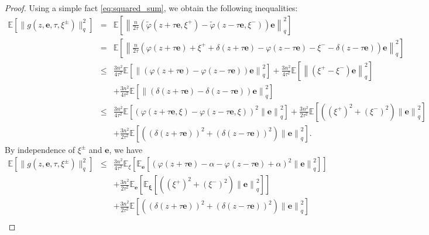 \documentclass[runningheads]{llncs}
\begin{document}
\begin{proof} Using a simple fact \eqref{eq:squared_sum}, we obtain the following inequalities:
    \begin{eqnarray*}
  \mathbb{E}\left[ \|g(z, \mathbf{e}, \tau,  \xi^{\pm})\|^2_q\right]
  &=&\mathbb{E}\left[\left\|\frac{n}{2\tau}\left(\tilde{\varphi}(z+ \tau \mathbf{e},  \xi^{+}) - \widetilde{\varphi}(z - \tau \mathbf{e},  \xi^{-})\right)\mathbf{e}\right\|_q^2\right] \nonumber\\
  &=& \mathbb{E}\left[\left\|\frac{n}{2\tau}\left(\varphi(z + \tau \mathbf{e}) + \xi^+ + \delta(z + \tau \mathbf{e})  -  \varphi(z - \tau \mathbf{e}) - \xi^- - \delta(z - \tau \mathbf{e}) \right)\mathbf{e}\right\|_q^2\right] \nonumber\\
  &\leq& \frac{3n^2}{4\tau^2}\mathbb{E}\left[\left\|\left(\varphi(z + \tau \mathbf{e}) -  \varphi(z - \tau \mathbf{e})\right)\mathbf{e}\right\|_q^2\right] + \frac{3n^2}{4\tau^2}\mathbb{E}\left[\left\|\left(\xi^+ - \xi^-\right)\mathbf{e}\right\|_q^2\right] \nonumber\\
  &&+ \frac{3n^2}{4\tau^2}\mathbb{E}\left[\left\|\left(\delta(z + \tau \mathbf{e})  - \delta(z - \tau \mathbf{e}) \right)\mathbf{e}\right\|_q^2\right] \nonumber\\
  &\leq& \frac{3n^2}{4\tau^2}\mathbb{E}\left[\left(\varphi(z + \tau \mathbf{e},\xi) -  \varphi(z - \tau \mathbf{e},\xi)\right)^2\left\|\mathbf{e}\right\|_q^2\right] + \frac{3n^2}{2\tau^2}\mathbb{E}\left[\left((\xi^+)^2 + (\xi^-)^2\right)\left\|\mathbf{e}\right\|_q^2\right] \nonumber\\
  &&+ \frac{3n^2}{2\tau^2}\mathbb{E}\left[\left((\delta(z + \tau \mathbf{e}) )^2+ (\delta(z - \tau \mathbf{e}) )^2\right)\left\|\mathbf{e}\right\|_q^2\right].
  \end{eqnarray*}
By independence of $\xi^{\pm}$ and $\mathbf{e}$, we have
\begin{eqnarray*}
  \mathbb{E}\left[ \|g(z, \mathbf{e}, \tau, \xi^{\pm})\|^2_q\right]
  &\leq& \frac{3n^2}{4\tau^2}\mathbb{E}_{\xi}\left[\mathbb{E}_{\mathbf{e}}\left[\left(\varphi(z + \tau \mathbf{e}) - \alpha -  \varphi(z - \tau \mathbf{e}) + \alpha\right)^2\left\|\mathbf{e}\right\|_q^2\right]\right] \nonumber\\
  &&+ \frac{3n^2}{2\tau^2}\mathbb{E}_{\mathbf{e}}\left[\mathbb{E}_{\mathbf{\xi}}\left[\left((\xi^+)^2 + (\xi^-)^2\right)\left\|\mathbf{e}\right\|_q^2\right]\right] \nonumber\\
  &&+ \frac{3n^2}{2\tau^2}\mathbb{E}\left[\left((\delta(z + \tau \mathbf{e}))^2+ (\delta(z - \tau \mathbf{e}))^2\right)\left\|\mathbf{e}\right\|_q^2\right] \nonumber\\

\end{eqnarray*}
\end{proof}
\end{document}
